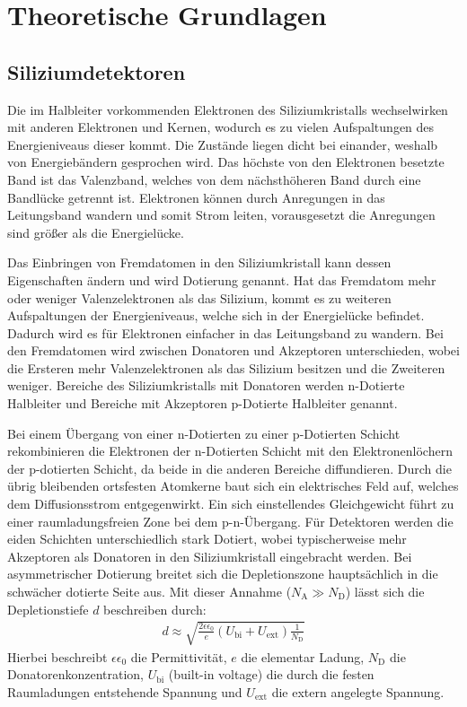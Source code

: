 \chapter{Theoretische Grundlagen}


\section{Siliziumdetektoren}

Die im Halbleiter vorkommenden Elektronen des Siliziumkristalls wechselwirken mit anderen Elektronen und
Kernen, wodurch es zu vielen Aufspaltungen des Energieniveaus dieser kommt. Die
Zustände liegen dicht bei einander, weshalb von Energiebändern gesprochen wird.
Das höchste von den Elektronen besetzte Band ist das Valenzband, welches von dem
nächsthöheren Band durch eine Bandlücke getrennt ist. Elektronen können
durch Anregungen in das Leitungsband wandern und somit Strom leiten, vorausgesetzt
die Anregungen sind größer als die Energielücke.

Das Einbringen von Fremdatomen in den Siliziumkristall kann dessen Eigenschaften ändern
und wird Dotierung genannt.
Hat das Fremdatom mehr oder weniger Valenzelektronen als das Silizium, kommt
es zu weiteren Aufspaltungen der Energieniveaus, welche sich in der Energielücke
befindet. Dadurch wird es für Elektronen einfacher in das Leitungsband zu wandern.
Bei den Fremdatomen wird zwischen Donatoren und Akzeptoren unterschieden, wobei die
Ersteren mehr Valenzelektronen als das Silizium besitzen und die Zweiteren weniger.
Bereiche des Siliziumkristalls mit Donatoren werden n-Dotierte Halbleiter
und Bereiche mit Akzeptoren p-Dotierte Halbleiter genannt.

Bei einem Übergang von einer n-Dotierten zu einer p-Dotierten Schicht rekombinieren
die Elektronen der n-Dotierten Schicht mit den Elektronenlöchern der p-dotierten Schicht, da beide
in die anderen Bereiche diffundieren. Durch die übrig bleibenden ortsfesten Atomkerne
baut sich ein elektrisches Feld auf, welches dem Diffusionsstrom entgegenwirkt.
Ein sich einstellendes Gleichgewicht führt zu einer raumladungsfreien Zone bei
dem p-n-Übergang.
Für Detektoren werden die eiden Schichten unterschiedlich stark Dotiert, wobei typischerweise
mehr Akzeptoren als Donatoren in den Siliziumkristall eingebracht werden. Bei
asymmetrischer Dotierung breitet sich die Depletionszone hauptsächlich in die schwächer dotierte Seite aus.
Mit dieser Annahme ($N_{\mathrm{A}} \gg N_{\mathrm{D}}$) lässt sich die Depletionstiefe $d$ beschreiben durch:
\begin{align}
  d \approx \sqrt{\frac{2 \epsilon \epsilon_0}{e} (U_{\mathrm{bi}}+U_{\mathrm{ext}})\frac{1}{N_{\mathrm{D}}}}
\end{align}
Hierbei beschreibt $\epsilon \epsilon_0$ die Permittivität, $e$ die elementar Ladung, $N_{\mathrm{D}}$ die Donatorenkonzentration, $U_{\mathrm{bi}}$ (built-in voltage)  die
durch die festen Raumladungen entstehende Spannung und $U_{\mathrm{ext}}$ die extern angelegte Spannung.

